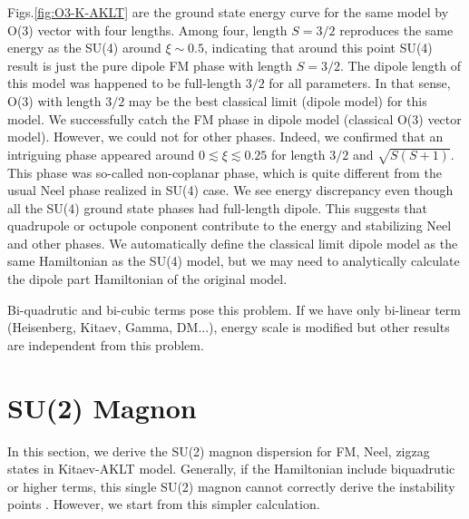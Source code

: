 \documentclass[11pt, aps, longbibliography]{article}
\begin{document}
Figs.\ref{fig:O3-K-AKLT} are the ground state energy curve for the same model by O(3) vector with four lengths.
Among four, length $S=3/2$ reproduces the same energy as the SU(4) around $\xi \sim 0.5$, 
indicating that around this point SU(4) result is just the pure dipole FM phase with length $S=3/2$.
The dipole length of this model was happened to be full-length $3/2$ for all parameters. In that sense, 
O(3) with length $3/2$ may be the best classical limit (dipole model) for this model.
We successfully catch the FM phase in dipole model (classical O(3) vector model). However, we could not for other phases.
Indeed, we confirmed that an intriguing phase appeared around $0 \lesssim \xi \lesssim 0.25$ for length $3/2$ and $\sqrt{S(S+1)}$. 
This phase was so-called non-coplanar phase, which is quite different from the usual Neel phase realized in SU(4) case.
We see energy discrepancy even though all the SU(4) ground state phases had full-length dipole.
This suggests that quadrupole or octupole conponent contribute to the energy and stabilizing Neel and other phases.
We automatically define the classical limit dipole model as the same Hamiltonian as the SU(4) model, 
but we may need to analytically calculate the dipole part Hamiltonian of the original model.

Bi-quadrutic and bi-cubic terms pose this problem. If we have only bi-linear term (Heisenberg, Kitaev, Gamma, DM...), energy scale is modified but other results are independent from this problem.

\newpage

\section{SU(2) Magnon}\label{sec:SU2_magnon}
In this section, we derive the SU(2) magnon dispersion for FM, Neel, zigzag states in Kitaev-AKLT model. 
Generally, if the Hamiltonian include biquadrutic or higher terms, this single SU(2) magnon cannot correctly derive the instability points \cite{10.1093/ptep/ptu109}.
However, we start from this simpler calculation.
\end{document}
